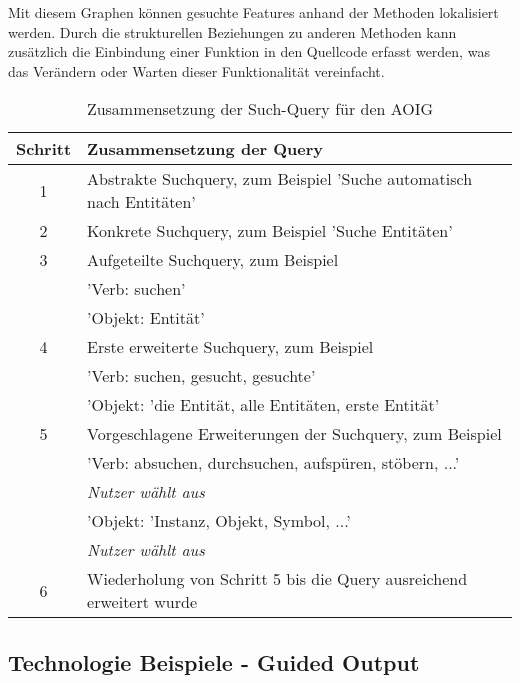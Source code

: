 \documentclass[runningheads,a4paper]{llncs}
\begin{document}
Mit diesem Graphen können gesuchte Features anhand der Methoden lokalisiert werden. Durch die strukturellen Beziehungen zu anderen Methoden kann zusätzlich die Einbindung einer Funktion in den Quellcode erfasst werden, was das Verändern oder Warten dieser Funktionalität vereinfacht.

\begin{table}[t]
	\centering
	\begin{tabular}{|c|l|}
		\hline
		\hspace{0.1cm} \textbf{Schritt} \hspace{0.1cm} & \textbf{Zusammensetzung der Query}\\
		\hline
		1 & Abstrakte Suchquery, zum Beispiel 'Suche automatisch nach Entitäten'\\
		\hline
		2 & Konkrete Suchquery, zum Beispiel 'Suche Entitäten'\\
		\hline
		3 & Aufgeteilte Suchquery, zum Beispiel\\
		& 'Verb: suchen'\\
		& 'Objekt: Entität'\\
		\hline
		4 & Erste erweiterte Suchquery, zum Beispiel\\
		& 'Verb: suchen, gesucht, gesuchte'\\
		& 'Objekt: 'die Entität, alle Entitäten, erste Entität'\\
		\hline
		5 & Vorgeschlagene Erweiterungen der Suchquery, zum Beispiel\\
		& 'Verb: absuchen, durchsuchen, aufspüren, stöbern, ...'\\
		& \textit{Nutzer wählt aus}\\
		& 'Objekt: 'Instanz, Objekt, Symbol, ...'\\
		& \textit{Nutzer wählt aus}\\
		\hline
		6 & Wiederholung von Schritt 5 bis die Query ausreichend erweitert wurde\\
		\hline
	\end{tabular}
	\vspace{0.2cm}
	\caption{Zusammensetzung der Such-Query für den \ac{AOIG}}
	\label{query}
\end{table}

\subsection*{Technologie Beispiele - Guided Output}
\end{document}
